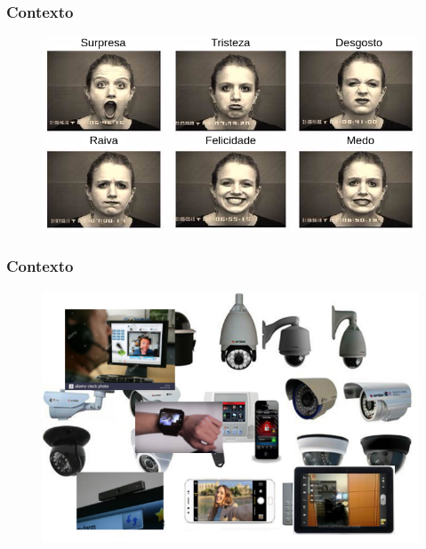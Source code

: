 \documentclass{beamer}
\begin{document}
\begin{frame}
\frametitle{Contexto}
\begin{figure}
\centering
\includegraphics[scale=0.39]{figuras/facesbasicas.png}
\label{fig:problema1}
\end{figure}
\end{frame} 



\begin{frame}
\frametitle{Contexto}
\begin{figure}
\centering
\includegraphics[scale=0.39]{figuras/contexto_21.png}
\label{fig:problema1}
\end{figure}
\end{frame}
\end{document}
